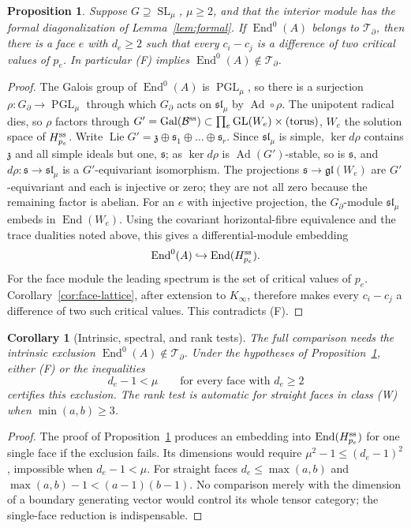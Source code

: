 \documentclass[11pt]{article}
\numberwithin{equation}{section}
\newtheorem{proposition}[proposition]{Proposition}
\newtheorem{corollary}[corollary]{Corollary}
\theoremstyle{definition}
\theoremstyle{remark}
\newcommand{\End}{\operatorname{End}}
\newcommand{\Gal}{\operatorname{Gal}}
\newcommand{\Lie}{\operatorname{Lie}}
\newcommand{\SL}{\operatorname{SL}}
\newcommand{\GL}{\operatorname{GL}}
\newcommand{\Tcal}{\mathcal T}
\newcommand{\PGL}{\operatorname{PGL}}
\newcommand{\Bcal}{\mathcal B}
\begin{document}
\begin{proposition}\label{prop:faces}
Suppose $G\supseteq\SL_\mu$, $\mu\ge2$, and that the interior module
has the formal diagonalization of Lemma~\ref{lem:formal}. If $\End^0(A)$
belongs to $\Tcal_\partial$, then there is a face $e$ with $d_e\ge2$ such that
every $c_i-c_j$ is a difference of two critical values of $p_e$. In particular
\textup{(F)} implies $\End^0(A)\notin\Tcal_\partial$.
\end{proposition}
\begin{proof}
The Galois group of $\End^0(A)$ is $\PGL_\mu$, so there is a surjection
$\rho:G_\partial\to\PGL_\mu$ through which $G_\partial$ acts on
$\mathfrak{sl}_\mu$ by $\operatorname{Ad}\circ\rho$. The unipotent radical dies,
so $\rho$ factors through $G'=\Gal(\Bcal^{\rm ss})\subset\prod_e\GL(W_e)\times(\text{torus})$,
$W_e$ the solution space of $H_{p_e}^{\rm ss}$. Write
$\Lie G'=\mathfrak z\oplus\mathfrak s_1\oplus\dots\oplus\mathfrak s_r$. Since
$\mathfrak{sl}_\mu$ is simple, $\ker d\rho$ contains $\mathfrak z$ and all simple
ideals but one, $\mathfrak s$; as $\ker d\rho$ is $\operatorname{Ad}(G')$-stable,
so is $\mathfrak s$, and $d\rho:\mathfrak s\to\mathfrak{sl}_\mu$ is a
$G'$-equivariant isomorphism. The projections
$\mathfrak s\to\mathfrak{gl}(W_e)$ are $G'$-equivariant and each is injective or
zero; they are not all zero because the remaining factor is abelian. For an
$e$ with injective projection, the $G_\partial$-module $\mathfrak{sl}_\mu$ embeds
in $\End(W_e)$. Using the covariant horizontal-fibre equivalence and the trace dualities
noted above, this gives a differential-module embedding
\[
 \End^0(A)\hookrightarrow\End(H_{p_e}^{\rm ss}).
\]
For the face module the leading spectrum is the set of critical values of
$p_e$. Corollary~\ref{cor:face-lattice}, after extension to $K_\infty$,
therefore makes every $c_i-c_j$ a difference of two such critical values.
This contradicts (F).
\end{proof}

\begin{corollary}[Intrinsic, spectral, and rank tests]\label{cor:boundary-tests}
The full comparison needs the intrinsic exclusion
$\End^0(A)\notin\Tcal_\partial$. Under the hypotheses of
Proposition~\ref{prop:faces}, either (F) or the inequalities
\[
 d_e-1<\mu\qquad\text{for every face with }d_e\ge2
\]
certifies this exclusion. The rank test is automatic for straight faces
in class (W) when $\min(a,b)\ge3$.
\end{corollary}
\begin{proof}
The proof of Proposition~\ref{prop:faces} produces an embedding into
$\End(H_{p_e}^{\rm ss})$ for one single face if the exclusion fails.
Its dimensions would require $\mu^2-1\le(d_e-1)^2$, impossible when
$d_e-1<\mu$. For straight faces $d_e\le\max(a,b)$ and
$\max(a,b)-1<(a-1)(b-1)$. No comparison merely with the dimension of a
boundary generating vector would control its whole tensor category;
the single-face reduction is indispensable.
\end{proof}
\end{document}
